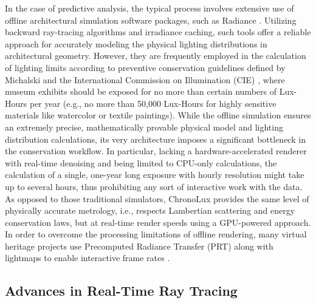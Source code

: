 \documentclass[conference]{IEEEtran}
\begin{document}
In the case of predictive analysis, the typical process involves extensive use of offline architectural simulation software packages, such as Radiance \cite{ward1998rendering}. Utilizing backward ray-tracing algorithms and irradiance caching, such tools offer a reliable approach for accurately modeling the physical lighting distributions in architectural geometry. However, they are frequently employed in the calculation of lighting limits according to preventive conservation guidelines defined by Michalski \cite{michalski1987damage} and the International Commission on Illumination (CIE) \cite{cie2004control}, where museum exhibits should be exposed for no more than certain numbers of Lux-Hours per year (e.g., no more than 50,000 Lux-Hours for highly sensitive materials like watercolor or textile paintings). While the offline simulation ensures an extremely precise, mathematically provable physical model and lighting distribution calculations, its very architecture imposes a significant bottleneck in the conservation workflow. In particular, lacking a hardware-accelerated renderer with real-time denoising and being limited to CPU-only calculations, the calculation of a single, one-year long exposure with hourly resolution might take up to several hours, thus prohibiting any sort of interactive work with the data. As opposed to those traditional simulators, ChronoLux provides the same level of physically accurate metrology, i.e., respects Lambertian scattering and energy conservation laws, but at real-time render speeds using a GPU-powered approach. In order to overcome the processing limitations of offline rendering, many virtual heritage projects use Precomputed Radiance Transfer (PRT) along with lightmaps to enable interactive frame rates \cite{sloan2002precomputed}.

\subsection{Advances in Real-Time Ray Tracing}
\end{document}
